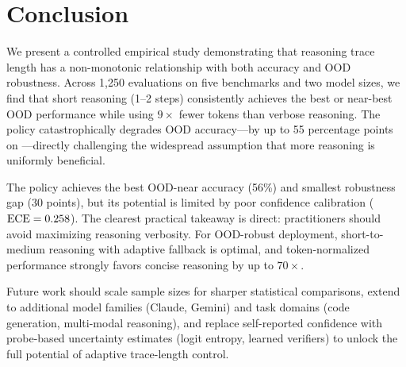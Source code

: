 \section{Conclusion}
\label{sec:conclusion}

We present a controlled empirical study demonstrating that reasoning trace length has a non-monotonic relationship with both accuracy and OOD robustness. Across 1,250 evaluations on five benchmarks and two model sizes, we find that short reasoning (1--2 steps) consistently achieves the best or near-best OOD performance while using $9\times$ fewer tokens than verbose reasoning. The \plong policy catastrophically degrades OOD accuracy---by up to 55 percentage points on \mini---directly challenging the widespread assumption that more reasoning is uniformly beneficial.

The \padaptive policy achieves the best OOD-near accuracy (56\%) and smallest robustness gap (30 points), but its potential is limited by poor confidence calibration ($\text{ECE} = 0.258$). The clearest practical takeaway is direct: practitioners should avoid maximizing reasoning verbosity. For OOD-robust deployment, short-to-medium reasoning with adaptive fallback is optimal, and token-normalized performance strongly favors concise reasoning by up to $70\times$.

Future work should scale sample sizes for sharper statistical comparisons, extend to additional model families (Claude, Gemini) and task domains (code generation, multi-modal reasoning), and replace self-reported confidence with probe-based uncertainty estimates (logit entropy, learned verifiers) to unlock the full potential of adaptive trace-length control.
